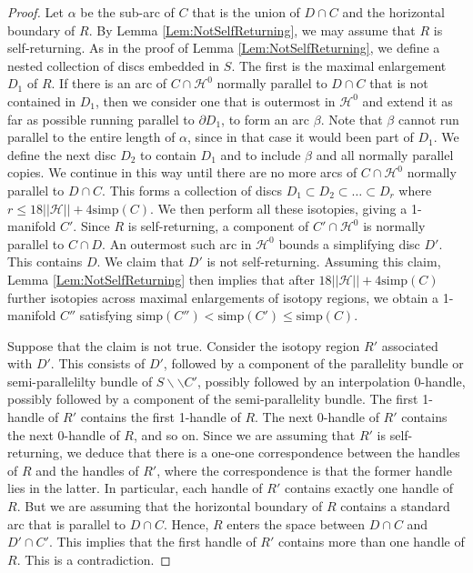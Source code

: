 \documentclass[oneside]{amsart}
\numberwithin{equation}{section}
\theoremstyle{plain}
\theoremstyle{definition}
\newcommand{\cut}{\backslash\backslash}
\newcommand{\calH}{\mathcal{H}}
\begin{document}
\begin{proof}
Let $\alpha$ be the sub-arc of $C$ that is the union of $D \cap C$ and the horizontal boundary of $R$.
By Lemma \ref{Lem:NotSelfReturning}, we may assume that $R$ is self-returning. As in the proof of Lemma \ref{Lem:NotSelfReturning}, we define a nested collection of discs embedded in $S$. The first is the maximal enlargement $D_1$ of $R$. If there is an arc of $C \cap \calH^0$ normally parallel to $D \cap C$ that is not contained in $D_1$, then we consider one that is outermost in $\calH^0$ and extend it as far as possible running parallel to $\partial D_1$, to form an arc $\beta$. Note that $\beta$ cannot run parallel to the entire length of $\alpha$, since in that case it would been part of $D_1$. We define the next disc $D_2$ to contain $D_1$ and to include $\beta$ and all normally parallel copies. We continue in this way until there are no more arcs of $C \cap \calH^0$ normally parallel to $D \cap C$. This forms a collection of discs $D_1 \subset D_2 \subset \dots \subset D_r$ where $r \leq 18||\calH|| + 4 \mathrm{simp}(C)$. We then perform all these isotopies, giving a 1-manifold $C'$. Since $R$ is self-returning, a component of $C' \cap \calH^0$ is normally parallel  to $C \cap D$. An outermost such arc in $\calH^0$ bounds a simplifying disc $D'$. This contains $D$. We claim that $D'$ is not self-returning. Assuming this claim, Lemma \ref{Lem:NotSelfReturning} then implies that after $18||\calH|| + 4 \mathrm{simp}(C)$ further isotopies across maximal enlargements of isotopy regions, we obtain a 1-manifold $C''$ satisfying $\mathrm{simp}(C'') < \mathrm{simp}(C') \leq \mathrm{simp}(C)$.

Suppose that the claim is not true. Consider the isotopy region $R'$ associated with $D'$. This consists of $D'$, followed by a component of the parallelity bundle or semi-parallelilty bundle of $S \cut C'$, possibly followed by an interpolation 0-handle, possibly followed by a component of the semi-parallelity bundle. The first 1-handle of $R'$ contains the first 1-handle of $R$. The next 0-handle of $R'$ contains the next 0-handle of $R$, and so on. Since we are assuming that $R'$ is self-returning, we deduce that there is a one-one correspondence between the handles of $R$ and the handles of $R'$, where the correspondence is that the former handle lies in the latter. In particular, each handle of $R'$ contains exactly one handle of $R$. But we are assuming that the horizontal boundary of $R$ contains a standard arc that is parallel to $D \cap C$. Hence, $R$ enters the space between $D \cap C$ and $D' \cap C'$. This implies that the first handle of $R'$ contains more than one handle of $R$. This is a contradiction.
\end{proof}
\end{document}
